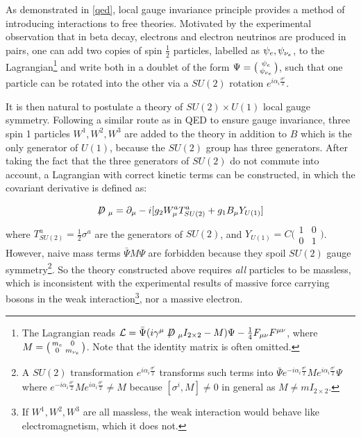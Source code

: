 As demonstrated in \cref{qed}, local gauge invariance principle provides a
method of introducing interactions to free theories.
Motivated by the experimental observation that in beta decay, electrons and
electron neutrinos are produced in pairs,
one can add two copies of spin $\frac{1}{2}$ particles,
labelled as $\psi_e, \psi_{{\nu}_e}$,
to the Lagrangian\footnote{
    The Lagrangian reads
    $\mathcal{L} = \bar{\Psi} (i \gamma^\mu \fsl{D}_\mu I_{2 \times 2} - M)\Psi -
    \frac{1}{4} F_{\mu\nu}F^{\mu\nu}$,
    where $M = \bigl(\begin{smallmatrix} m_e & 0 \\ 0 & m_{{\nu}_e} \end{smallmatrix}\bigr)$.
    Note that the identity matrix is often omitted.
} and write both in a doublet
of the form
$\Psi = \bigl(\begin{smallmatrix} \psi_e \\ \psi_{{\nu}_e} \end{smallmatrix}\bigr)$,
such that one particle can be rotated into the other via a $SU(2)$ rotation
$e^{i \alpha_i \frac{\sigma^i}{2}}$.

It is then natural to postulate a theory of $SU(2) \times U(1)$ local gauge
symmetry.
Following a similar route as in QED to ensure gauge invariance,
three spin 1 particles $W^1, W^2, W^3$ are added to the theory in addition to
$B$ which is the only generator of $U(1)$,
because the $SU(2)$ group has three generators.
After taking the fact that the three generators of $SU(2)$ do not commute into
account, a Lagrangian with correct kinetic terms can be constructed, in which
the covariant derivative is defined as:

\begin{equation}
    \fsl{D}_\mu = \partial_\mu - i[g_2 W_\mu^a T^a_{SU(2)} + g_1 B_\mu Y_{U(1)}]
\end{equation}
where $T^a_{SU(2)} = \frac{1}{2} \sigma^a$ are the generators of $SU(2)$,
and
$Y_{U(1)} = C \bigl(\begin{smallmatrix} 1 & 0 \\ 0 & 1 \end{smallmatrix}\bigr)$.
However, naive mass terms $\bar{\Psi} M \Psi$ are forbidden because they
spoil $SU(2)$ gauge symmetry\footnote{
    A $SU(2)$ transformation $e^{i \alpha_i \frac{\sigma^i}{2}}$ transforms such
    terms into
    $\bar{\Psi} e^{-i \alpha_i \frac{\sigma^i}{2}} M e^{i \alpha_i \frac{\sigma^i}{2}} \Psi$
    where $e^{-i \alpha_i \frac{\sigma^i}{2}} M e^{i \alpha_i \frac{\sigma^i}{2}} \neq M$
    because $[\sigma^i, M] \neq 0$ in general as $M \neq m I_{2 \times 2}$.
}.
So the theory constructed above requires \emph{all} particles to be massless,
which is inconsistent with the experimental results of massive force carrying
bosons in the weak interaction\footnote{
    If $W^1, W^2, W^3$ are all massless, the weak interaction would behave like
    electromagnetism, which it does not.
}, nor a massive electron.

